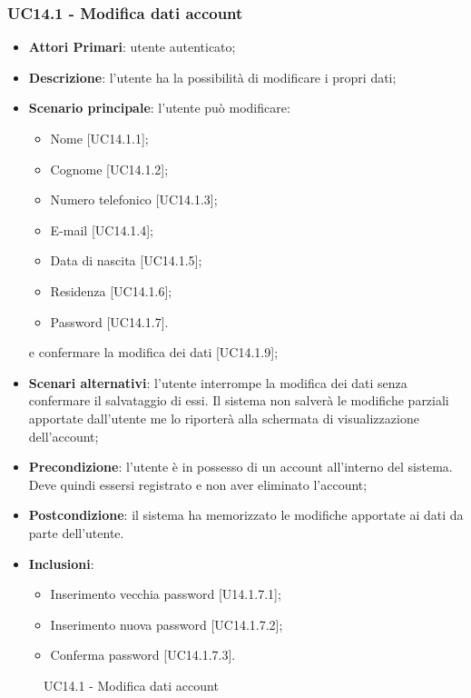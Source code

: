 \subsubsection{UC14.1 - Modifica dati account}
\begin{itemize}
	\item \textbf{Attori Primari}: utente autenticato;
	\item \textbf{Descrizione}: l'utente ha la possibilità di modificare i propri dati;
	\item \textbf{Scenario principale}: l'utente può modificare:
	\begin{itemize}
		\item Nome [UC14.1.1];
		\item Cognome [UC14.1.2];
		\item Numero telefonico [UC14.1.3];
		\item E-mail [UC14.1.4];
		\item Data di nascita [UC14.1.5];
		\item Residenza [UC14.1.6];
		\item Password [UC14.1.7].
	\end{itemize}
	e confermare la modifica dei dati [UC14.1.9];
	\item \textbf{Scenari alternativi}: l'utente interrompe la modifica dei dati senza confermare il salvataggio di essi. Il sistema non salverà le modifiche parziali apportate dall'utente me lo riporterà alla schermata di visualizzazione dell'account;	 
	\item \textbf{Precondizione}: l'utente è in possesso di un account all'interno del sistema. Deve quindi essersi registrato e non aver eliminato l'account;
	\item \textbf{Postcondizione}: il sistema ha memorizzato le modifiche apportate ai dati da parte dell’utente.
	\item \textbf{Inclusioni}:
	\begin{itemize}
		\item Inserimento vecchia password [U14.1.7.1];
		\item Inserimento nuova password [UC14.1.7.2];
		\item Conferma password [UC14.1.7.3].
	\end{itemize}
\end{itemize}
\begin{figure}[h]
	\centering
	\caption{UC14.1 - Modifica dati account}
\end{figure}
\newpage 
